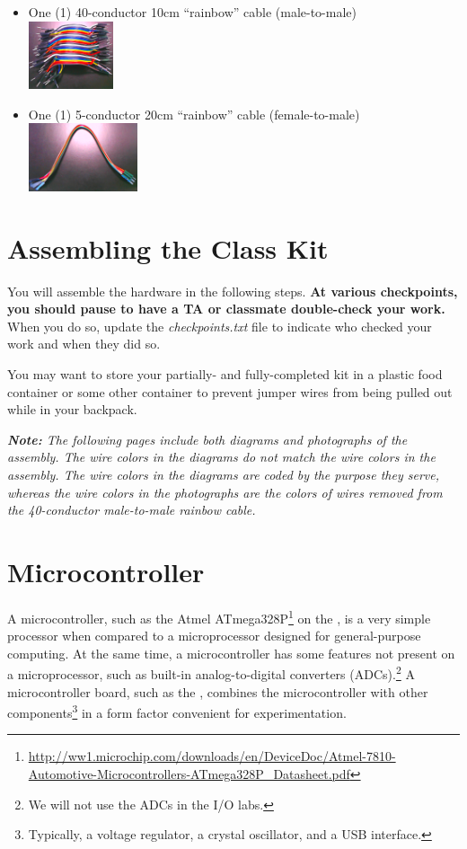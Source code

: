 \begin{itemize}
    \item One (1) 40-conductor 10cm ``rainbow'' cable (male-to-male) \\
        \includegraphics[height=2cm]{mm-cable}
    \item One (1) 5-conductor 20cm ``rainbow'' cable (female-to-male) \\
        \includegraphics[height=2cm]{fm-cable}
\end{itemize}

\vspace{0.5cm}

\section*{Assembling the Class Kit}

You will assemble the hardware in the following steps. \textbf{At various
checkpoints, you should pause to have a TA or classmate double-check your
work.} When you do so, update the \textit{checkpoints.txt} file to indicate who
checked your work and when they did so.

You may want to store your partially- and fully-completed kit in a plastic food
container or some other container to prevent jumper wires from being pulled out
while in your backpack.

\textit{\textbf{Note:} The following pages include both diagrams and
photographs of the assembly. The wire colors in the diagrams do not match the
wire colors in the assembly. The wire colors in the diagrams are coded by the
purpose they serve, whereas the wire colors in the photographs are the colors
of wires removed from the 40-conductor male-to-male rainbow cable.}

\section{Microcontroller}

A microcontroller, such as the Atmel ATmega328P\footnote{\url{http://ww1.microchip.com/downloads/en/DeviceDoc/Atmel-7810-Automotive-Microcontrollers-ATmega328P_Datasheet.pdf}}
on the \nano, is a very simple processor when compared to a
microprocessor designed for general-purpose computing. At the same time, a
microcontroller has some features not present on a microprocessor, such as
built-in analog-to-digital converters (ADCs).\footnote{We will not use the ADCs
in the I/O labs.} A microcontroller board, such as the \nano, combines
the microcontroller with other components\footnote{Typically, a voltage
regulator, a crystal oscillator, and a USB interface.} in a form factor
convenient for experimentation.

